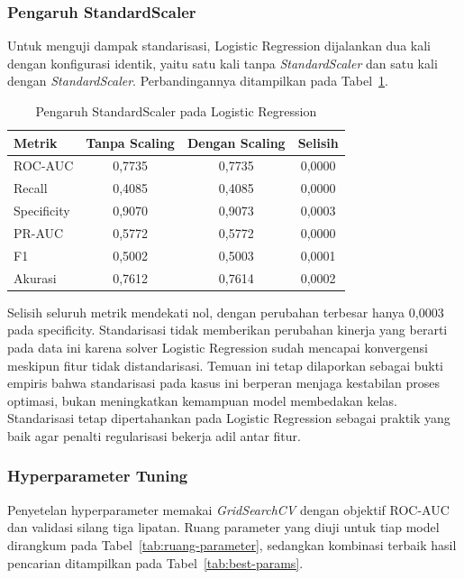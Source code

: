 \subsubsection{Pengaruh StandardScaler}
\label{subsec:pengaruh-scaler}
Untuk menguji dampak standarisasi, Logistic Regression dijalankan dua kali dengan konfigurasi identik, yaitu satu kali tanpa \textit{StandardScaler} dan satu kali dengan \textit{StandardScaler}. Perbandingannya ditampilkan pada Tabel~\ref{tab:scaling}.

\begin{table}[H]
\centering
\caption{Pengaruh StandardScaler pada Logistic Regression}
\label{tab:scaling}
\begin{tabular}{lccc}
\toprule
\textbf{Metrik} & \textbf{Tanpa Scaling} & \textbf{Dengan Scaling} & \textbf{Selisih} \\
\midrule
ROC-AUC     & 0,7735 & 0,7735 & 0,0000 \\
Recall      & 0,4085 & 0,4085 & 0,0000 \\
Specificity & 0,9070 & 0,9073 & 0,0003 \\
PR-AUC      & 0,5772 & 0,5772 & 0,0000 \\
F1          & 0,5002 & 0,5003 & 0,0001 \\
Akurasi     & 0,7612 & 0,7614 & 0,0002 \\
\bottomrule
\end{tabular}
\end{table}

Selisih seluruh metrik mendekati nol, dengan perubahan terbesar hanya 0,0003 pada specificity. Standarisasi tidak memberikan perubahan kinerja yang berarti pada data ini karena solver Logistic Regression sudah mencapai konvergensi meskipun fitur tidak distandarisasi. Temuan ini tetap dilaporkan sebagai bukti empiris bahwa standarisasi pada kasus ini berperan menjaga kestabilan proses optimasi, bukan meningkatkan kemampuan model membedakan kelas. Standarisasi tetap dipertahankan pada Logistic Regression sebagai praktik yang baik agar penalti regularisasi bekerja adil antar fitur.

\subsubsection{Hyperparameter Tuning}
\label{subsec:tuning}
Penyetelan hyperparameter memakai \textit{GridSearchCV} dengan objektif ROC-AUC dan validasi silang tiga lipatan. Ruang parameter yang diuji untuk tiap model dirangkum pada Tabel~\ref{tab:ruang-parameter}, sedangkan kombinasi terbaik hasil pencarian ditampilkan pada Tabel~\ref{tab:best-params}.

